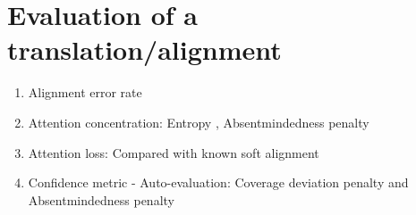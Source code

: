 \documentclass{article}
\begin{document}
\section{Evaluation of a translation/alignment}
\begin{enumerate}
\item Alignment error rate
\item Attention concentration: Entropy \citep{Ghader2017what}, Absentmindedness penalty \citep{Rikters2017confidence}
\item Attention loss: Compared with known soft alignment
\item Confidence metric - Auto-evaluation: Coverage deviation penalty and Absentmindedness penalty \citep{Rikters2017confidence}

\end{enumerate}


\pagebreak 



\end{document}

